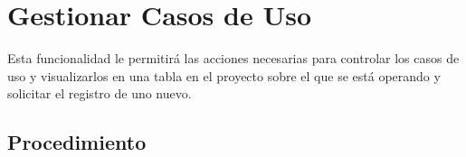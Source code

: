 \hypertarget{cv:GestionarCU}{\section{Gestionar Casos de Uso}} \label{sec:GestionarCU}

	Esta funcionalidad le permitirá las acciones necesarias para controlar los casos de uso y visualizarlos en una tabla en el proyecto sobre el que se está operando y solicitar el registro de uno nuevo.

		\subsection{Procedimiento}

